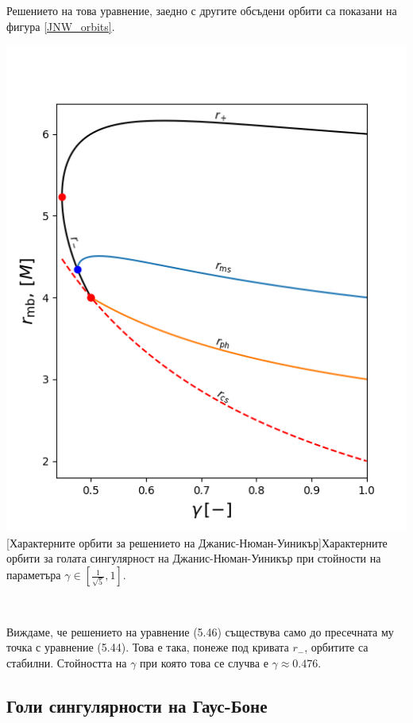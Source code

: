 Решението на това уравнение, заедно с другите обсъдени орбити са показани на фигура \ref{JNW_orbits}.\\
\begin{minipage}{14em}
	\hspace{-0.3cm}
	\includegraphics[scale = 0.45]{JNW_orbits.png}
	[Характерните орбити за решението на Джанис-Нюман-Уиникър]{\small Характерните орбити за голата сингулярност на Джанис-Нюман-Уиникър при стойности на параметъра $\gamma \in [\frac{1}{\sqrt{5}}, 1]$.}
	\label{JNW_orbits}
\end{minipage}\,\,\,
\begin{minipage}{20em}
Виждаме, че решението на уравнение (5.46) съществува само до пресечната му точка с уравнение (5.44). Това е така, понеже под кривата $r_-$, орбитите са стабилни. Стойността на $\gamma$ при която това се случва е $\gamma\approx 0.476$.

\end{minipage}
\newpage
\subsection{Голи сингулярности на Гаус-Боне}
